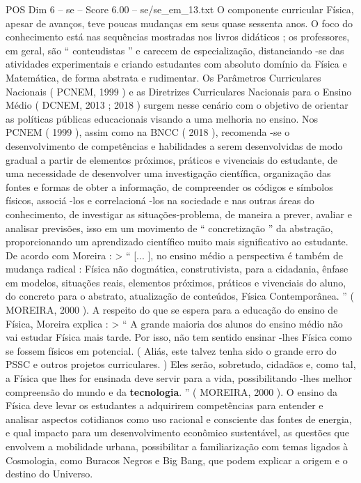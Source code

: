 \begin{textsample}{POS Dim 6 – se – Score 6.00 – se/se\_em\_13.txt}
O componente curricular Física, apesar de avanços, teve poucas mudanças em seus quase sessenta anos.
O foco do conhecimento está nas sequências mostradas nos livros didáticos ; os professores, em geral, são “ conteudistas ” e carecem de especialização, distanciando -se das atividades experimentais e criando estudantes com absoluto domínio da Física e Matemática, de forma abstrata e rudimentar.
Os Parâmetros Curriculares Nacionais ( PCNEM, 1999 ) e as Diretrizes Curriculares Nacionais para o Ensino Médio ( DCNEM, 2013 ; 2018 ) surgem nesse cenário com o objetivo de orientar as políticas públicas educacionais visando a uma melhoria no ensino.
Nos PCNEM ( 1999 ), assim como na BNCC ( 2018 ), recomenda -se o desenvolvimento de competências e habilidades a serem desenvolvidas de modo gradual a partir de elementos próximos, práticos e vivenciais do estudante, de uma necessidade de desenvolver uma investigação científica, organização das fontes e formas de obter a informação, de compreender os códigos e símbolos físicos, associá -los e correlacioná -los na sociedade e nas outras áreas do conhecimento, de investigar as situações-problema, de maneira a prever, avaliar e analisar previsões, isso em um movimento de “ concretização ” da abstração, proporcionando um aprendizado científico muito mais significativo ao estudante.
De acordo com Moreira : > “ [... ], no ensino médio a perspectiva é também de mudança radical : Física não dogmática, construtivista, para a cidadania, ênfase em modelos, situações reais, elementos próximos, práticos e vivenciais do aluno, do concreto para o abstrato, atualização de conteúdos, Física Contemporânea. ” ( MOREIRA, 2000 ).
A respeito do que se espera para a educação do ensino de Física, Moreira explica : > “ A grande maioria dos alunos do ensino médio não vai estudar Física mais tarde.
Por isso, não tem sentido ensinar -lhes Física como se fossem físicos em potencial. ( Aliás, este talvez tenha sido o grande erro do PSSC e outros projetos curriculares. ) Eles serão, sobretudo, cidadãos e, como tal, a Física que lhes for ensinada deve servir para a vida, possibilitando -lhes melhor compreensão do mundo e da \textbf{tecnologia}. ” ( MOREIRA, 2000 ).
O ensino da Física deve levar os estudantes a adquirirem competências para entender e analisar aspectos cotidianos como uso racional e consciente das fontes de energia, e qual impacto para um desenvolvimento econômico sustentável, as questões que envolvem a mobilidade urbana, possibilitar a familiarização com temas ligados à Cosmologia, como Buracos Negros e Big Bang, que podem explicar a origem e o destino do Universo.

\end{textsample}
